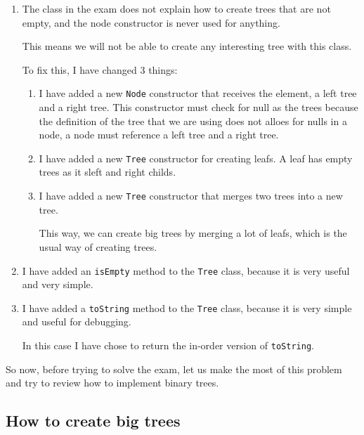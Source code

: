 \documentclass[a4paper, 9pt]{extarticle}
\begin{document}
\begin{enumerate}

  \item The class in the exam does not explain how to create trees that are not
    empty, and the node constructor is never used for anything.

    This means we will not be able to create any interesting tree with this class.

    To fix this, I have changed 3 things:

    \begin{enumerate}

      \item I have added a new \texttt{Node} constructor that receives the
        element, a left tree and a right tree. This constructor must check for
        null as the trees because the definition of the tree that we are using
        does not alloes for nulls in a node, a node must reference a left tree
        and a right tree.

      \item I have added a new \texttt{Tree} constructor for creating leafs. A
        leaf has empty trees as it sleft and right childs.

      \item I have added a new \texttt{Tree} constructor that merges two trees into a new tree.

        This way, we can create big trees by merging a lot of leafs, which is
        the usual way of creating trees.

    \end{enumerate}

  \item I have added an \texttt{isEmpty} method to the \texttt{Tree} class,
    because it is very useful and very simple.

  \item I have added a \texttt{toString} method to the \texttt{Tree} class,
    because it is very simple and useful for debugging.

    In this case I have chose to return the in-order version of \texttt{toString}.

\end{enumerate}


So now, before trying to solve the exam, let us make the most of this problem
and try to review how to implement binary trees.

\newpage
\subsection{How to create big trees}
\end{document}
